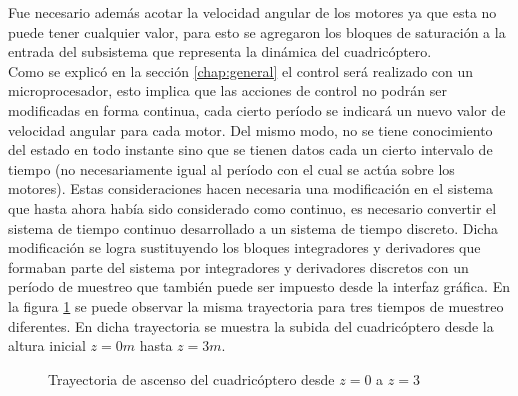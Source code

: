 \documentclass[main]{subfiles}
\begin{document}
Fue necesario adem\'as acotar la velocidad angular de los motores ya que esta no puede tener cualquier valor, para esto se agregaron los bloques de saturaci\'on a la entrada del subsistema que representa la din\'amica del cuadric\'optero.\\

Como se explic\'o en la secci\'on \ref{chap:general} el control ser\'a realizado con un microprocesador, esto implica que las acciones de control no podr\'an ser modificadas en forma continua, cada cierto per\'iodo se indicar\'a un nuevo valor de velocidad angular para cada motor. Del mismo modo, no se tiene conocimiento del estado en todo instante sino que se tienen datos cada un cierto intervalo de tiempo (no necesariamente igual al per\'iodo con el cual se act\'ua sobre los motores). Estas consideraciones hacen necesaria una modificaci\'on en el sistema que hasta ahora hab\'ia sido considerado como continuo, es necesario convertir el sistema de tiempo continuo desarrollado a un sistema de tiempo discreto. Dicha modificaci\'on se logra sustituyendo los bloques integradores y derivadores que formaban parte del sistema por integradores y derivadores discretos con un per\'iodo de muestreo que tambi\'en puede ser impuesto desde la interfaz gr\'afica. En la figura \ref{fig:t_muestreo} se puede observar la misma trayectoria para tres tiempos de muestreo diferentes. En dicha trayectoria se muestra la subida del cuadric\'optero desde la altura inicial $z=0m$ hasta $z=3m$. 
 
\begin{figure} [h!]
  \centering
  \caption{Trayectoria de ascenso del cuadric\'optero desde $z=0$ a $z=3$}
  \label{fig:t_muestreo}
\end{figure} 
 
\end{document}
